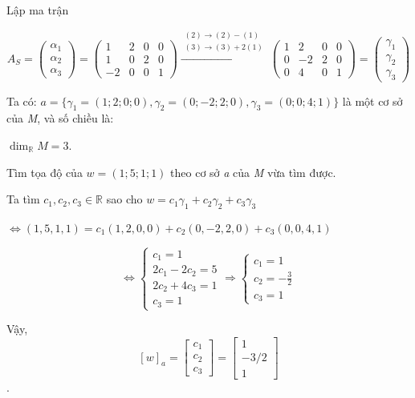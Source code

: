 \documentclass[12pt,a4paper]{article}
\begin{document}
Lập ma trận

\[A_S = \begin{pmatrix} \alpha_1 \\ \alpha_2 \\ \alpha_3 \end{pmatrix} = \begin{pmatrix} 1 & 2 & 0 & 0 \\ 1 & 0 & 2 & 0 \\ -2 & 0 & 0 & 1 \end{pmatrix} \xrightarrow{\substack{(2) \to (2) - (1) \\ (3) \to (3) + 2(1)}} \begin{pmatrix} 1 & 2 & 0 & 0 \\ 0 & -2 & 2 & 0 \\ 0 & 4 & 0 & 1 \end{pmatrix} = \begin{pmatrix} \gamma_1 \\ \gamma_2 \\ \gamma_3 \end{pmatrix}\]

Ta có: $a = \{ \gamma_1 = (1; 2; 0; 0), \gamma_2 = (0; -2; 2; 0), \gamma_3 = (0; 0; 4; 1) \}$ là một cơ sở
của \emph{M}, và số chiều là:

$\dim_{\mathbb{R}} M = 3$.

Tìm tọa độ của $w = (1; 5; 1; 1)$ theo
cơ sở \emph{a} của \emph{M} vừa tìm được.

Ta tìm $c_1, c_2, c_3 \in \mathbb{R}$ sao cho
$w = c_1 \gamma_1 + c_2 \gamma_2 + c_3 \gamma_3$

$\Leftrightarrow (1, 5, 1, 1) = c_1(1, 2, 0, 0) + c_2(0, -2, 2, 0) + c_3(0, 0, 4, 1)$

\[\Leftrightarrow \begin{cases} c_1 = 1 \\ 2c_1 - 2c_2 = 5 \\ 2c_2 + 4c_3 = 1 \\ c_3 = 1 \end{cases} \Rightarrow \begin{cases} c_1 = 1 \\ c_2 = -\frac{3}{2} \\ c_3 = 1 \end{cases}\]

Vậy, \[[w]_a = \begin{bmatrix} c_1 \\ c_2 \\ c_3 \end{bmatrix} = \begin{bmatrix} 1 \\ -3/2 \\ 1 \end{bmatrix}\].
\end{document}
